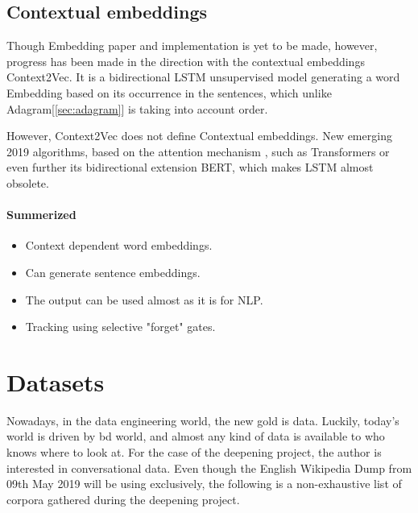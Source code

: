 \subsection{Contextual embeddings}
Though Embedding paper and implementation is yet to be made, however, progress has been made in the direction with the contextual embeddings Context2Vec\cite{article:context2vec}. It is a bidirectional LSTM\cite{article:lstm} unsupervised model generating a word Embedding based on its occurrence in the sentences, which unlike Adagram[\ref{sec:adagram}] is taking into account order. 


However, Context2Vec does not define Contextual embeddings. New emerging 2019 algorithms, based on the attention mechanism \cite{article:attention-is-all-you-need}, such as Transformers\cite{article:transformer} or even further its bidirectional extension BERT\cite{article:bert}, which makes LSTM almost obsolete.

\paragraph{Summerized}
\begin{itemize}
    \setlength\itemsep{0em}
    \item Context dependent word embeddings.
    \item Can generate sentence embeddings.
    \item The output can be used almost as it is for NLP.
    \item Tracking using selective "forget" gates.
\end{itemize}


\section{Datasets}
Nowadays, in the data engineering world, the new gold is data. Luckily, today's world is driven by \gls{bd} world, and almost any kind of data is available to who knows where to look at. For the case of the deepening project, the author is interested in conversational data. Even though the English Wikipedia Dump from 09th May 2019 will be using exclusively, the following is a non-exhaustive list of corpora gathered during the deepening project.

